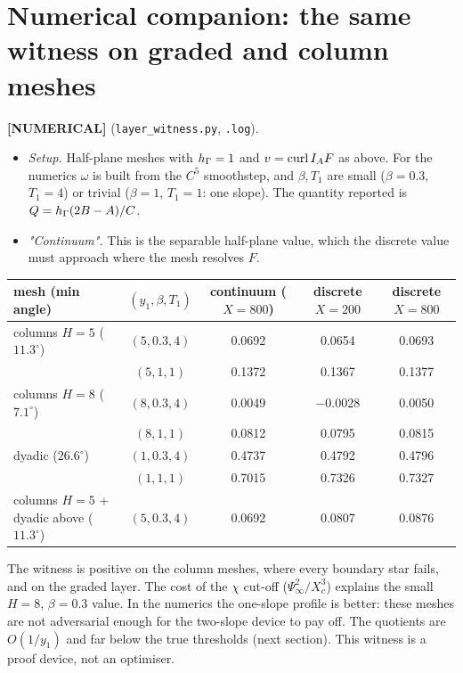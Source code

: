 \documentclass[11pt]{article}
\theoremstyle{remark}\newtheorem{remark}[theorem]{Remark}
\newcommand{\lab}[1]{\textbf{[#1]}}
\begin{document}
\section{Numerical companion: the same witness on graded and column meshes}\label{sec:num}
\lab{NUMERICAL} (\texttt{layer\_witness.py}, \texttt{.log}).
\begin{itemize}
\item \emph{Setup.} Half-plane meshes with $h_\Gamma=1$ and $v=\operatorname{curl} I_AF$ as above. For the numerics $\omega$ is built from the
  $C^5$ smoothstep, and $\beta,T_1$ are small ($\beta=0.3$, $T_1=4$) or trivial ($\beta=1$, $T_1=1$: one slope). The
  quantity reported is $Q=h_\Gamma(2B-A)/C$.
\item \emph{"Continuum".} This is the separable half-plane value, which the discrete value must approach where the mesh
  resolves $F$.
\end{itemize}
\begin{center}\small\begin{tabular}{lcccc}
\toprule
mesh (min angle) & $(y_1,\beta,T_1)$ & continuum ($X=800$) & discrete $X=200$ & discrete $X=800$\\
\midrule
columns $H=5$ ($11.3^\circ$) & $(5,0.3,4)$ & 0.0692 & 0.0654 & 0.0693\\
 & $(5,1,1)$ & 0.1372 & 0.1367 & 0.1377\\
columns $H=8$ ($7.1^\circ$) & $(8,0.3,4)$ & 0.0049 & $-0.0028$ & 0.0050\\
 & $(8,1,1)$ & 0.0812 & 0.0795 & 0.0815\\
dyadic ($26.6^\circ$) & $(1,0.3,4)$ & 0.4737 & 0.4792 & 0.4796\\
 & $(1,1,1)$ & 0.7015 & 0.7326 & 0.7327\\
columns $H=5$ + dyadic above ($11.3^\circ$) & $(5,0.3,4)$ & 0.0692 & 0.0807 & 0.0876\\
\bottomrule
\end{tabular}\end{center}
The witness is positive on the column meshes, where every boundary star fails, and on the graded layer. The cost of the
$\chi$ cut-off ($\Psi_\infty^2/X_c^3$) explains the small $H=8$, $\beta=0.3$ value. In the numerics the one-slope profile is
better: these meshes are not adversarial enough for the two-slope device to pay off. The quotients are $O(1/y_1)$ and far
below the true thresholds (next section). This witness is a proof device, not an optimiser.
\end{document}
